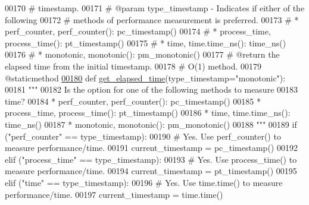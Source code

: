 \begin{DoxyCode}
00170     \textcolor{comment}{#       timestamp.}
00171     \textcolor{comment}{#   @param type\_timestamp - Indicates if either of the following}
00172     \textcolor{comment}{#               methods of performance measurement is preferred.}
00173     \textcolor{comment}{#               * perf\_counter, perf\_counter(): pc\_timestamp()}
00174     \textcolor{comment}{#               * process\_time, process\_time(): pt\_timestamp()}
00175     \textcolor{comment}{#               * time, time.time\_ns(): time\_ns()}
00176     \textcolor{comment}{#               * monotonic, monotonic(): pm\_monotonic()}
00177     \textcolor{comment}{#   @return the elapsed time from the initial timestamp.}
00178     \textcolor{comment}{#   O(1) method.}
00179     @staticmethod
\hypertarget{performance__measurement__no__ns_8py_source_l00180}{}\hyperlink{classutilities_1_1timing__measurements_1_1performance__measurement__no__ns_1_1execution__time__measurement_a465918aa8dcf663887149cbf9a7306b9}{00180}     \textcolor{keyword}{def }\hyperlink{classutilities_1_1timing__measurements_1_1performance__measurement__no__ns_1_1execution__time__measurement_a465918aa8dcf663887149cbf9a7306b9}{get\_elapsed\_time}(type\_timestamp="monotonic"):
00181         \textcolor{stringliteral}{"""}
00182 \textcolor{stringliteral}{            Is the option for one of the following methods to measure}
00183 \textcolor{stringliteral}{                time?}
00184 \textcolor{stringliteral}{                * perf\_counter, perf\_counter(): pc\_timestamp()}
00185 \textcolor{stringliteral}{                * process\_time, process\_time(): pt\_timestamp()}
00186 \textcolor{stringliteral}{                * time, time.time\_ns(): time\_ns()}
00187 \textcolor{stringliteral}{                * monotonic, monotonic(): pm\_monotonic()}
00188 \textcolor{stringliteral}{        """}
00189         \textcolor{keywordflow}{if} (\textcolor{stringliteral}{"perf\_counter"} == type\_timestamp):
00190             \textcolor{comment}{# Yes. Use perf\_counter() to measure performance/time.}
00191             current\_timestamp = pc\_timestamp()
00192         \textcolor{keywordflow}{elif} (\textcolor{stringliteral}{"process\_time"} == type\_timestamp):
00193             \textcolor{comment}{# Yes. Use process\_time() to measure performance/time.}
00194             current\_timestamp = pt\_timestamp()
00195         \textcolor{keywordflow}{elif} (\textcolor{stringliteral}{"time"} == type\_timestamp):
00196             \textcolor{comment}{# Yes. Use time.time() to measure performance/time.}
00197             current\_timestamp = time.time()

\end{DoxyCode}
